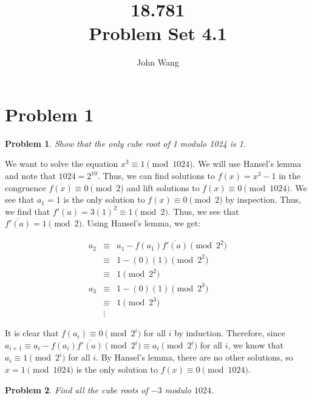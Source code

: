 \documentclass[psamsfonts]{amsart}
\title{18.781 \\
Problem Set 4.1}
\author{John Wang}
\newtheorem{prob}{Problem}[section]
\newenvironment{sol}{{\bfseries Solution}}{\qedsymbol}
\theoremstyle{definition}
\theoremstyle{remark}
\numberwithin{equation}{section}
\begin{document}
\maketitle

\section{Problem 1}

\begin{prob}
Show that the only cube root of 1 modulo 1024 is 1. 
\end{prob}

\begin{sol}
We want to solve the equation $x^3 \equiv 1 \pmod{1024}$. We will use Hansel's lemma and note that $1024 = 2^{10}$. Thus, we can find solutions to $f(x) = x^3 - 1$ in the congruence $f(x) \equiv 0 \pmod{2}$ and lift solutions to $f(x) \equiv 0 \pmod{1024}$. We see that $a_1 = 1$ is the only solution to $f(x) \equiv 0 \pmod{2}$ by inspection. Thus, we find that $f'(a) = 3(1)^2 \equiv 1 \pmod{2}$. Thus, we see that $\overline{f'(a)} = 1 \pmod{2}$. Using Hansel's lemma, we get:

\begin{eqnarray}
a_2 &\equiv& a_1 - f(a_1) \overline{f'(a)} \pmod {2^2} \\
&\equiv& 1 - (0)(1) \pmod{2^2} \\
&\equiv& 1 \pmod {2^2} \\
a_3 &\equiv& 1 - (0)(1) \pmod{2^3} \\
&\equiv& 1 \pmod{2^3} \\
&\vdots&
\end{eqnarray}

It is clear that $f(a_i) \equiv 0 \pmod{2^i}$ for all $i$ by induction. Therefore, since $a_{i+1} \equiv a_i - f(a_i) \overline{f'(a)} \pmod{2^i} \equiv a_i \pmod{2^i}$ for all $i$, we know that $a_i \equiv 1 \pmod{2^i}$ for all $i$. By Hansel's lemma, there are no other solutions, so $x = 1 \pmod{1024}$ is the only solution to $f(x) \equiv 0 \pmod{1024}$. 
\end{sol}

\begin{prob}
Find all the cube roots of $-3$ modulo $1024$. 
\end{prob}
\end{document}
